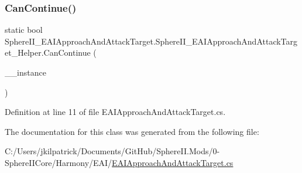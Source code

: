 \subsubsection{\texorpdfstring{CanContinue()}{CanContinue()}}
{\footnotesize\ttfamily static bool Sphere\+I\+I\+\_\+\+E\+A\+I\+Approach\+And\+Attack\+Target.\+Sphere\+I\+I\+\_\+\+E\+A\+I\+Approach\+And\+Attack\+Target\+\_\+\+Helper.\+Can\+Continue (\begin{DoxyParamCaption}\item[{E\+A\+I\+Approach\+And\+Attack\+Target}]{\+\_\+\+\_\+instance }\end{DoxyParamCaption})\hspace{0.3cm}{\ttfamily [static]}}



Definition at line 11 of file E\+A\+I\+Approach\+And\+Attack\+Target.\+cs.



The documentation for this class was generated from the following file\+:\begin{DoxyCompactItemize}
\item 
C\+:/\+Users/jkilpatrick/\+Documents/\+Git\+Hub/\+Sphere\+I\+I.\+Mods/0-\/\+Sphere\+I\+I\+Core/\+Harmony/\+E\+A\+I/\mbox{\hyperlink{_e_a_i_approach_and_attack_target_8cs}{E\+A\+I\+Approach\+And\+Attack\+Target.\+cs}}\end{DoxyCompactItemize}
